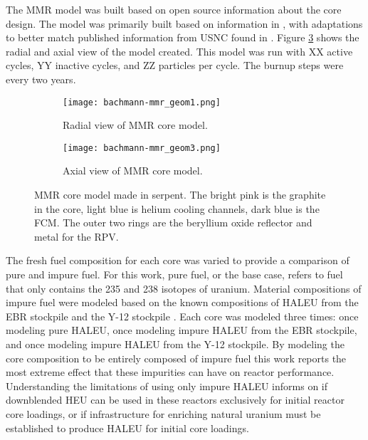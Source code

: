 The \gls{MMR} model was built based on open source information 
about the core design. The model was primarily built based on 
information in \cite{hawari_development_2018}, with adaptations to 
better match published information from \gls{USNC} found in 
\cite{noauthor_usnc_2021}. Figure \ref{fig:mmr_core} shows the radial 
and axial view of the model created. This model was run with XX active 
cycles, YY inactive cycles, and ZZ particles per cycle. The burnup steps
were every two years.

\begin{figure}
    \centering 
    \begin{subfigure}{0.45\textwidth}
        \centering 
        \texttt{[image: bachmann-mmr\_geom1.png]}
        \caption{Radial view of MMR core model.}
        \label{fig:mmr_core_radial}        
    \end{subfigure}
    \hfill
    \begin{subfigure}{0.45\textwidth}
        \centering 
        \texttt{[image: bachmann-mmr\_geom3.png]}
        \caption{Axial view of MMR core model.}
        \label{fig:mmr_core_axial}        
    \end{subfigure}
    \caption{MMR core model made in serpent. The bright pink is the 
    graphite in the core, light blue is helium cooling channels, 
    dark blue is the FCM. The outer two rings are the 
    beryllium oxide reflector and metal for the RPV.}
    \label{fig:mmr_core}
\end{figure}

The fresh fuel composition for each core was varied to provide 
a comparison of pure and impure fuel. For this work, pure fuel, 
or the base case, refers to fuel that only contains the 235 and 
238 isotopes of uranium. 
Material compositions of impure fuel were modeled based on the 
known compositions of \gls{HALEU} from the \gls{EBR} stockpile 
\cite{vaden_isotopic_2018} and the Y-12 stockpile \cite{nelson_foreign_2010}.
Each core was modeled three times: once modeling pure \gls{HALEU}, 
once modeling impure \gls{HALEU} from the \gls{EBR} stockpile, and once 
modeling impure \gls{HALEU} from the Y-12 stockpile.
By modeling the core composition to be entirely composed of impure fuel 
this work reports the most extreme effect that these impurities can 
have on reactor performance. Understanding the limitations of using only 
impure \gls{HALEU} informs on if downblended \gls{HEU} can be used in 
these reactors exclusively for initial reactor core loadings, or if 
infrastructure for enriching natural uranium must be established to 
produce \gls{HALEU} for initial core loadings. 

